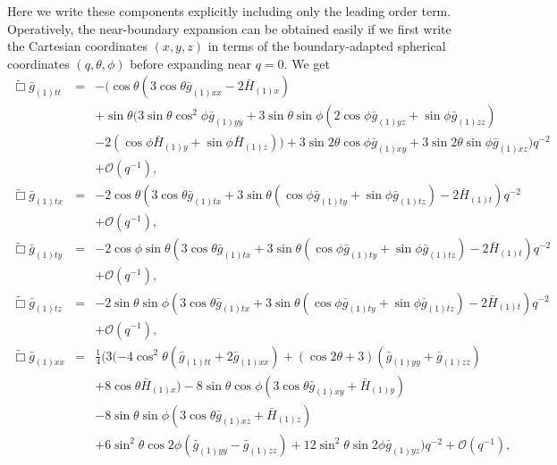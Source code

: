 \documentclass[a4paper,11pt]{article}
\numberwithin{equation}{section}
\begin{document}
Here we write these components explicitly including only the leading order term. Operatively, the near-boundary expansion can be obtained easily if we first write the Cartesian coordinates $(x,y,z)$ in terms of the boundary-adapted spherical coordinates $(q,\theta,\phi)$ before expanding near $q=0$. We get
\begin{eqnarray}\label{eqn:efett}
\tilde{\Box}\bar{g}_{(1)tt}&=&-(\cos \theta (3 \cos \theta  \bar{g}_{(1)xx}-2 \bar{H}_{(1)x}) \nonumber \\
&&+\sin\theta (3 \sin \theta \cos^2\phi \bar{g}_{(1) yy}+3
   \sin \theta  \sin \phi (2 \cos \phi  \bar{g}_{(1) yz}+\sin\phi
   \bar{g}_{(1) zz}) \nonumber \\
   &&-2 (\cos \phi \bar{H}_{(1) y}+\sin\phi
   \bar{H}_{(1) z}))+3 \sin 2 \theta  \cos \phi \bar{g}_{(1) xy}+3
   \sin 2 \theta  \sin \phi \bar{g}_{(1) xz})q^{-2} \nonumber \\
&&+\mathcal{O}(q^{-1}),\\
%
\label{eqn:efetx}
\tilde{\Box}\bar{g}_{(1)tx}&=&-2 \cos \theta (3 \cos\theta \bar{g}_{(1) tx}+3 \sin \theta
   (\cos \phi  \bar{g}_{(1) ty}+\sin \phi  \bar{g}_{(1)tz})-2
   \bar{H}_{(1) t})    q^{-2} \nonumber \\
&&+\mathcal{O}(q^{-1}),\\
%
\label{eqn:efety}
\tilde{\Box}\bar{g}_{(1)ty}&=&-2 \cos \phi \sin\theta (3 \cos\theta \bar{g}_{(1) tx}+3 \sin \theta
   (\cos \phi  \bar{g}_{(1) ty}+\sin \phi  \bar{g}_{(1)tz})-2
   \bar{H}_{(1) t})    q^{-2} \nonumber \\
&&+\mathcal{O}(q^{-1}),\\
%
\label{eqn:efetz}
\tilde{\Box}\bar{g}_{(1)tz}&=&-2 \sin \theta \sin\phi (3 \cos\theta \bar{g}_{(1) tx}+3 \sin \theta
   (\cos \phi \bar{g}_{(1) ty}+\sin \phi  \bar{g}_{(1)tz})-2
   \bar{H}_{(1) t})    q^{-2} \nonumber \\
&&+\mathcal{O}(q^{-1}),\\
%
\label{eqn:efexx}
\tilde{\Box}\bar{g}_{(1)xx}&=&\frac{1}{4} (3 (-4 \cos ^2\theta (\bar{g}_{(1) tt}+2 \bar{g}_{(1)
   xx})+(\cos 2 \theta +3) (\bar{g}_{(1) yy}+\bar{g}_{(1)
zz}) \nonumber \\
&&+8 \cos \theta  \bar{H}_{(1) x})-8 \sin \theta  \cos \phi 
   (3 \cos \theta  \bar{g}_{(1)xy}+\bar{H}_{(1) y}) \nonumber \\
   &&-8 \sin\theta \sin\phi (3 \cos\theta \bar{g}_{(1) xz}+\bar{H}_{(1) z}) \nonumber \\
   &&+6 \sin^2\theta  \cos 2 \phi  (\bar{g}_{(1)yy}-\bar{g}_{(1)zz})+12
   \sin^2\theta  \sin 2 \phi  \bar{g}_{(1) yz})    q^{-2} +\mathcal{O}(q^{-1}),\\

\end{eqnarray}
\end{document}
